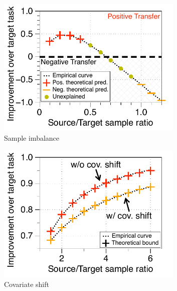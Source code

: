 \begin{figure}[!t]
	\begin{subfigure}[b]{0.32\textwidth}
		\centering
		\includegraphics[width=0.98\textwidth]{figures/datapoints_phase_transition.pdf}
		\caption{Sample imbalance}
		\label{fig_size}
	\end{subfigure}\hfill
	\begin{subfigure}[b]{0.32\textwidth}
		\centering
		\includegraphics[width=0.98\textwidth]{figures/complementary.pdf}
		\caption{Covariate shift}
		\label{fig_covariate}
	\end{subfigure}\hfill
	\begin{subfigure}[b]{0.32\textwidth}
		\centering

\end{subfigure}
\end{figure}
